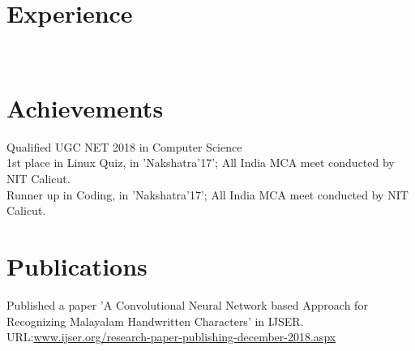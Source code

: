 \documentclass[11pt]{hieudo-build}
\begin{document}
\begin{minipage}[t]{0.34\textwidth}
  \sectionsep
  \sectionsep
  \end{minipage} 
  \hfill
  \begin{minipage}[t]{0.63\textwidth} 
  \section{Experience}

   \\

   \section{Achievements}
    \textbullet{} Qualified UGC NET 2018 in Computer Science \\
     \textbullet{} 1st place in Linux Quiz,
      in 'Nakshatra'17'; All India  MCA meet conducted by NIT Calicut.\\
       \textbullet{} Runner up in Coding, in 'Nakshatra'17'; All India 
        MCA meet conducted by NIT Calicut. 
         


         \section{Publications}
         \textbullet{}Published a paper 'A Convolutional Neural Network based Approach for Recognizing Malayalam Handwritten Characters' in IJSER.\\
         URL:\href {  https://www.ijser.org/onlineResearchPaperViewer.aspx?A-Convolutional-Neural-Network-based-Approach-for-Recognizing-Malayalam-Handwritten-Characters.pdf}{www.ijser.org/research-paper-publishing-december-2018.aspx}


\end{minipage}
\end{document}
